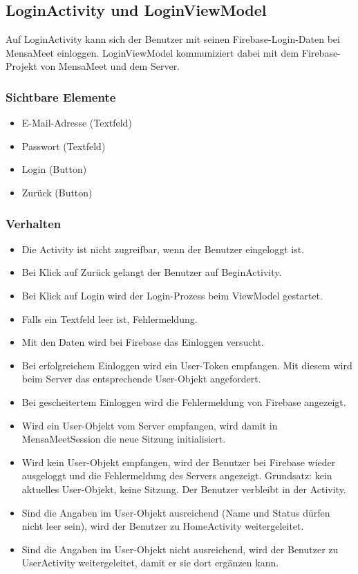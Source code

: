 \documentclass[a4paper]{scrreprt}
\begin{document}
\subsection{LoginActivity und LoginViewModel}

Auf LoginActivity kann sich der Benutzer mit seinen Firebase-Login-Daten bei MensaMeet einloggen. LoginViewModel kommuniziert dabei mit dem Firebase-Projekt von MensaMeet und dem Server.

\subsubsection{Sichtbare Elemente}
\begin{itemize}
\item E-Mail-Adresse (Textfeld)
\item Passwort (Textfeld)
\item Login (Button)
\item Zurück (Button)
\end{itemize}

\subsubsection{Verhalten}
\begin{itemize}
\item Die Activity ist nicht zugreifbar, wenn der Benutzer eingeloggt ist.
\item Bei Klick auf Zurück gelangt der Benutzer auf BeginActivity.
\item Bei Klick auf Login wird der Login-Prozess beim ViewModel gestartet.
\item Falls ein Textfeld leer ist, Fehlermeldung.
\item Mit den Daten wird bei Firebase das Einloggen versucht. 
\item Bei erfolgreichem Einloggen wird ein User-Token empfangen. Mit diesem wird beim Server das entsprechende User-Objekt angefordert.
\item Bei gescheitertem Einloggen wird die Fehlermeldung von Firebase angezeigt.
\item Wird ein User-Objekt vom Server empfangen, wird damit in MensaMeetSession die neue Sitzung initialisiert. 
\item Wird kein User-Objekt empfangen, wird der Benutzer bei Firebase wieder ausgeloggt und die Fehlermeldung des Servers angezeigt. Grundsatz: kein aktuelles User-Objekt, keine Sitzung. Der Benutzer verbleibt in der Activity.
\item Sind die Angaben im User-Objekt ausreichend (Name und Status dürfen nicht leer sein), wird der Benutzer zu HomeActivity weitergeleitet.
\item Sind die Angaben im User-Objekt nicht ausreichend, wird der Benutzer zu UserActivity weitergeleitet, damit er sie dort ergänzen kann.

\end{itemize}
\end{document}

